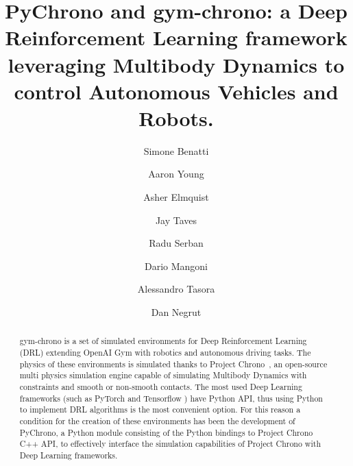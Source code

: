\documentclass{svproc}
\begin{document}
\mainmatter              %
%
\title{PyChrono and gym-chrono: a Deep Reinforcement Learning framework leveraging Multibody Dynamics to \\ control Autonomous Vehicles and Robots.}
%
%
\author{Simone Benatti \and Aaron Young \and
Asher Elmquist  \and Jay Taves  \and Radu Serban  \and
Dario Mangoni \and Alessandro Tasora \and
Dan Negrut  }

%
%
%

\maketitle              %

\begin{abstract}
gym-chrono is a set of simulated environments for Deep Reinforcement Learning (DRL) extending OpenAI Gym \cite{Brockman16Gym} with robotics and autonomous driving tasks. The physics of these environments is simulated thanks to Project Chrono~\cite{chronoOverview2016}, an open-source multi physics simulation engine capable of simulating Multibody Dynamics with constraints and smooth or non-smooth contacts. The most used Deep Learning frameworks (such as PyTorch and Tensorflow ) have Python API, thus using Python to implement DRL algorithms is the most convenient option. For this reason a condition for the creation of these environments has been the development of PyChrono, a Python module consisting of the Python bindings to Project Chrono C++ API, to effectively interface the simulation capabilities of Project Chrono with Deep Learning frameworks.
\end{abstract}
%
\end{document}
